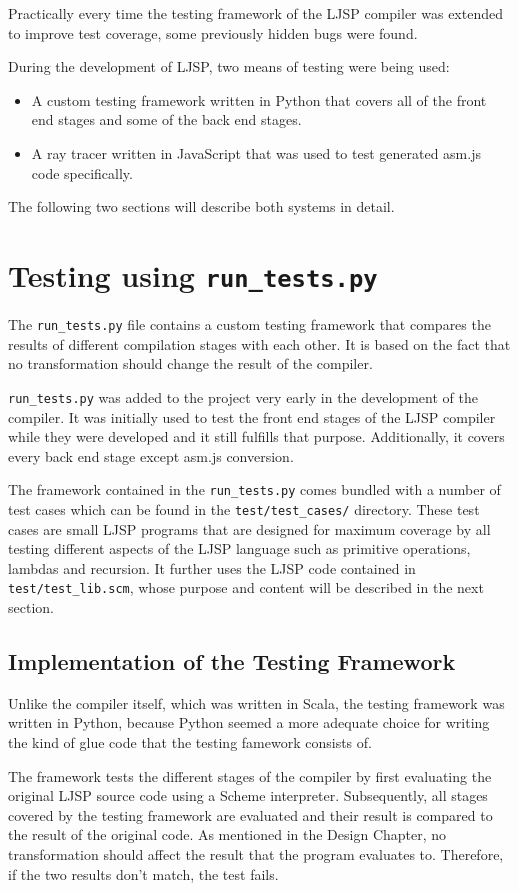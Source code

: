 \documentclass[11pt]{report}
\begin{document}
Practically every time the testing framework of the LJSP compiler was extended to improve test coverage, some previously hidden bugs were found.

During the development of LJSP, two means of testing were being used:
\begin{itemize}
\item A custom testing framework written in Python that covers all of the front end stages and some of the back end stages.
\item A ray tracer written in JavaScript that was used to test generated asm.js code specifically.
\end{itemize}
The following two sections will describe both systems in detail.

\section{Testing using \texttt{run_tests.py}}
The \texttt{run_tests.py} file contains a custom testing framework that compares the results of different compilation stages with each other. It is based on the fact that no transformation should change the result of the compiler.

\texttt{run_tests.py} was added to the project very early in the development of the compiler. It was initially used to test the front end stages of the LJSP compiler while they were developed and it still fulfills that purpose. Additionally, it covers every back end stage except asm.js conversion.

The framework contained in the \texttt{run_tests.py} comes bundled with a number of test cases which can be found in the \texttt{test/test_cases/} directory. These test cases are small LJSP programs that are designed for maximum coverage by all testing different aspects of the LJSP language such as primitive operations, lambdas and recursion. It further uses the LJSP code contained in \texttt{test/test_lib.scm}, whose purpose and content will be described in the next section.

\subsection{Implementation of the Testing Framework}
Unlike the compiler itself, which was written in Scala, the testing framework was written in Python, because Python seemed a more adequate choice for writing the kind of glue code that the testing famework consists of. 

The framework tests the different stages of the compiler by first evaluating the original LJSP source code using a Scheme interpreter. Subsequently, all stages covered by the testing framework are evaluated and their result is compared to the result of the original code. As mentioned in the Design Chapter, no transformation should affect the result that the program evaluates to. Therefore, if the two results don't match, the test fails.
\end{document}
